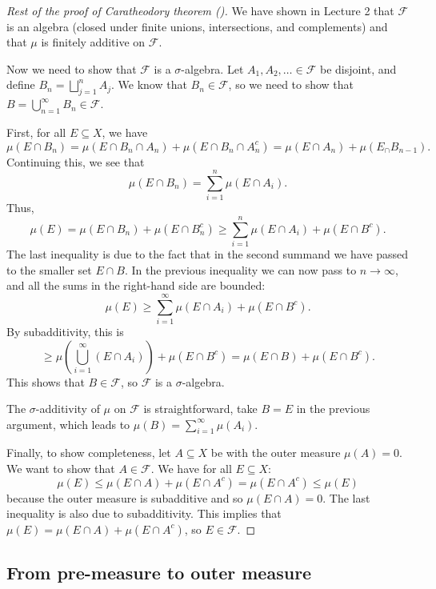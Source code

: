 \documentclass{article}
\theoremstyle{definition}
\begin{document}
\begin{proof}[Rest of the proof of Caratheodory theorem ()]
	We have shown in Lecture 2 that $\mathscr{F}$ is an algebra (closed under finite unions,
	intersections, and complements) and that $\mu$ is finitely additive on $\mathscr{F}$.

	Now we need to show that $\mathscr{F}$ is a $\sigma$-algebra. Let $A_1,A_2,\ldots\in \mathscr{F} $
	be disjoint, and define $B_n=\bigsqcup_{j=1}^{n}A_j$.
	We know that $B_n\in \mathscr{F}$,
	so we need to show that $B=\bigcup_{n=1}^{\infty}B_n\in \mathscr{F}$.

	First, for all $E\subseteq X$, we have
	\begin{equation*}
		\mu(E\cap B_n)=\mu(E\cap B_n\cap A_n)+\mu(E\cap B_n\cap A_n^c)
		=
		\mu(E\cap A_n)+\mu(E_\cap B_{n-1}).
	\end{equation*}
	Continuing this, we see that 
	\begin{equation*}
		\mu(E\cap B_n)=\sum_{i=1}^{n}\mu(E\cap A_i).
	\end{equation*}
	Thus, 
	\begin{equation*}
		\mu(E)=\mu(E\cap B_n)+\mu(E\cap B_n^c)\ge \sum_{i=1}^{n}\mu(E\cap A_i)+\mu(E\cap B^c).
	\end{equation*}
	The last inequality is due to the fact that in the second summand 
	we have passed to the smaller set $E\cap B$.
	In the previous inequality we can now pass to $n\to\infty$, and all the sums in the 
	right-hand side are bounded:
	\begin{equation*}
		\mu(E)\ge \sum_{i=1}^{\infty}\mu(E\cap A_i)+\mu(E\cap B^c).
	\end{equation*}
	By subadditivity, this is 
	\begin{equation*}
		\ge \mu\left( \bigcup_{i=1}^{\infty}(E\cap A_i) \right)+\mu(E\cap B^c)
		=\mu(E\cap B)+\mu(E\cap B^c).
	\end{equation*}
	This shows that $B\in \mathscr{F}$, so $\mathscr{F}$ is a $\sigma$-algebra.

	The $\sigma$-additivity of $\mu$ on $\mathscr{F}$ is straightforward, take $B=E$ in the previous
	argument, which leads to $\mu(B)=\sum_{i=1}^{\infty}\mu(A_i)$.

	Finally, to show completeness, let $A\subseteq X$ be with the outer measure $\mu(A)=0$.
	We want to show that $A\in \mathscr{F}$.
	We have for all $E\subseteq X$:
	\begin{equation*}
		\mu(E)\le \mu(E\cap A)+\mu(E\cap A^c)=\mu(E\cap A^c)\le \mu(E)
	\end{equation*}
	because the outer measure is subadditive and so $\mu(E\cap A)=0$.
	The last inequality is also due to subadditivity.
	This implies that $\mu(E)=\mu(E\cap A)+\mu(E\cap A^c)$, 
	so $E\in \mathscr{F}$.
\end{proof}

\subsection{From pre-measure to outer measure}
\end{document}
